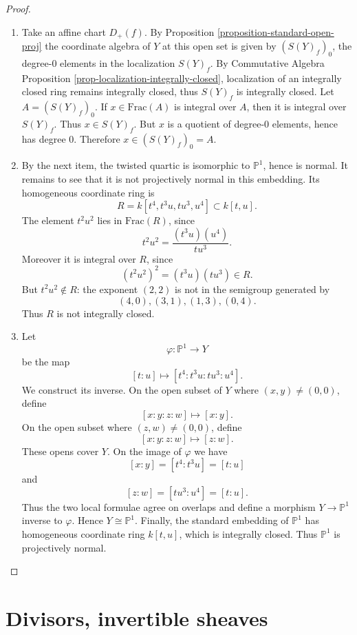 \documentclass{book}
\begin{document}
\begin{proof}
\begin{enumerate}
\item Take an affine chart $D_+(f)$.
By Proposition
\ref{proposition-standard-open-proj}
the coordinate algebra of $Y$
at this open set is given by
$(S(Y)_f)_0$, the degree-0 elements
in the localization $S(Y)_f$.
By Commutative Algebra Proposition
\ref{prop-localization-integrally-closed},
localization of an integrally closed
ring remains integrally closed,
thus $S(Y)_f$ is integrally closed.
Let $A=(S(Y)_f)_0$.
If $x \in \text{Frac}(A)$ is integral
over $A$, then it is integral over
$S(Y)_f$.
Thus $x \in S(Y)_f$.
But $x$ is a quotient of degree-0
elements, hence has degree 0.
Therefore $x \in (S(Y)_f)_0=A$.

\item By the next item, the twisted quartic
is isomorphic to $\mathbb{P}^1$, hence is
normal.
It remains to see that it is not
projectively normal in this embedding.
Its homogeneous coordinate ring is
\[
R=k[t^4,t^3u,tu^3,u^4]\subset k[t,u].
\]
The element $t^2u^2$ lies in
$\text{Frac}(R)$, since
\[
t^2u^2=\frac{(t^3u)(u^4)}{tu^3}.
\]
Moreover it is integral over $R$, since
\[
(t^2u^2)^2=(t^3u)(tu^3)\in R.
\]
But $t^2u^2\notin R$: the exponent
$(2,2)$ is not in the semigroup generated
by
\[
(4,0),(3,1),(1,3),(0,4).
\]
Thus $R$ is not integrally closed.

\item Let
\[
\varphi:\mathbb{P}^1\to Y
\]
be the map
\[
[t:u]\longmapsto [t^4:t^3u:tu^3:u^4].
\]
We construct its inverse.
On the open subset of $Y$ where
$(x,y)\neq (0,0)$, define
\[
[x:y:z:w]\longmapsto [x:y].
\]
On the open subset where
$(z,w)\neq (0,0)$, define
\[
[x:y:z:w]\longmapsto [z:w].
\]
These opens cover $Y$.
On the image of $\varphi$ we have
\[
[x:y]=[t^4:t^3u]=[t:u]
\]
and
\[
[z:w]=[tu^3:u^4]=[t:u].
\]
Thus the two local formulae agree on
overlaps and define a morphism
$Y\to \mathbb{P}^1$ inverse to
$\varphi$.
Hence $Y\cong \mathbb{P}^1$.
Finally, the standard embedding of
$\mathbb{P}^1$ has homogeneous
coordinate ring $k[t,u]$,
which is integrally closed.
Thus $\mathbb{P}^1$ is projectively
normal.
\end{enumerate}
\end{proof}



\section{Divisors, invertible sheaves}
\label{section-divisors-line-bundles}
\end{document}
